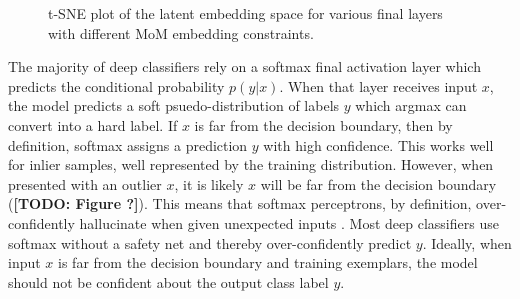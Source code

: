 \documentclass[10pt,twocolumn,letterpaper]{article}
\newcommand{\TODO}[1]{\textbf{\color{red}[TODO: #1]}}
\begin{document}
\begin{figure}[ht]
	\centering
	
	\caption{t-SNE plot of the latent embedding space for various final layers with different MoM embedding constraints.} 
	\label{fig:cifar10tsne}
\end{figure}

The majority of deep classifiers rely on a softmax final activation layer which predicts the conditional probability $p(y|x)$.
When that layer receives input $x$, the model predicts a soft psuedo-distribution of labels $y$ which argmax can convert into a hard label.
If $x$ is far from the decision boundary, then by definition, softmax assigns a prediction $y$ with high confidence.
This works well for inlier samples, well represented by the training distribution.
However, when presented with an outlier $x$, it is likely $x$ will be far from the decision boundary (\TODO{Figure ?}).
This means that softmax perceptrons, by definition, over-confidently hallucinate when given unexpected inputs \cite{wei2022mitigating}. 
Most deep classifiers use softmax without a safety net and thereby over-confidently predict $y$.
Ideally, when input $x$ is far from the decision boundary and training exemplars, the model should not be confident about the output class label $y$.
\end{document}
